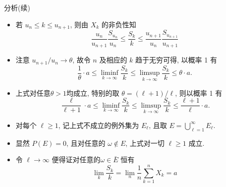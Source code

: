 \begin{frame}{分析(续)}
\begin{itemize}[<+-|alert@+>]
\item 若 \( u_{n} \leq k \leq u_{n+1} \), 则由 \( X_{k} \) 的非负性知
\[
\frac{u_{n}}{u_{n+1}} \frac{S_{u_{n}}}{u_{n}} \leq \frac{S_{k}}{k} \leq \frac{u_{n+1}}{u_{n}} \frac{S_{u_{n+1}}}{u_{n+1}}
\]

\item 注意 \( u_{n+1} / u_{n} \rightarrow \theta \), 故令 \( n\) 及相应的 \( k \) 趋于无穷可得, 以概率 1 有
\[
\frac{1}{\theta} \cdot a \leq \liminf_{k\rightarrow\infty} \frac{S_{k}}{k} \leq \limsup_{k\rightarrow\infty} \frac{S_{k}}{k} \leq \theta\cdot a.
\]
\item 上式对任意$\theta>1$均成立, 特别的取 \( \theta=(\ell+1) / \ell \), 则以概率 1 有
\[
\frac{\ell}{\ell+1} \cdot a  \leq \liminf_{k\rightarrow\infty} \frac{S_{k}}{k} \leq \limsup_{k\rightarrow\infty} \frac{S_{k}}{k} \leq \frac{\ell+1}{\ell} \cdot a .
\]

\item 对每个 \( \ell \geq 1 \), 记上式不成立的例外集为 \( E_{\ell} \), 且取 \( E=\bigcup_{\ell=1}^{\infty} E_{\ell} \).
\item 显然 \( P(E)=0 \), 且对任意的 \(\omega\notin E \), 上式对一切 \( \ell \geq 1 \) 成立.
\item 令 \( \ell \rightarrow \infty \) 便得证对任意的\(\omega\in \bar{E} \) 恒有
\[
\lim _{k} \frac{S_{k}}{k}=\lim _{n} \frac{1}{n} \sum_{k=1}^{n} X_{k}=a
\]
\end{itemize}



\end{frame}

